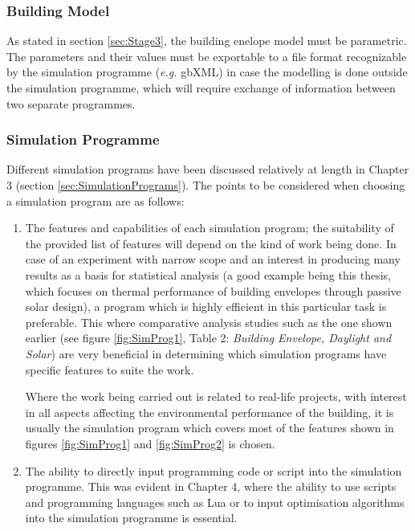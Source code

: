 \subsubsection{Building Model}

As stated in section \ref{sec:Stage3}, the building enelope model must be parametric. The parameters and their values must be exportable to a file format recognizable by the simulation programme (\emph{e.g.} gbXML) in case the modelling is done outside the simulation programme, which will require exchange of information between two separate programmes.

\subsubsection{Simulation Programme}
Different simulation programs have been discussed relatively at length in Chapter 3 (section \ref{sec:SimulationPrograms}). The points to be considered when choosing a simulation program are as follows:

\begin{enumerate}
	\item The features and capabilities of each simulation program; the suitability of the provided list of features will depend on the kind of work being done. In case of an experiment with narrow scope and an interest in producing many results as a basis for statistical analysis (a good example being this thesis, which focuses on thermal performance of building envelopes through passive solar design), a program which is highly efficient in this particular task is preferable. This where comparative analysis studies such as the one shown earlier (see figure \ref{fig:SimProg1}, Table 2: \emph{Building Envelope, Daylight and Solar}) are very beneficial in determining which simulation programs have specific features to suite the work.

		Where the work being carried out is related to real-life projects, with interest in all aspects affecting the environmental performance of the building, it is usually the simulation program which covers most of the features shown in figures \ref{fig:SimProg1} and \ref{fig:SimProg2} is chosen.
	
	\item The ability to directly input programming code or script into the simulation programme. This was evident in Chapter 4, where the ability to use scripts and programming languages such as Lua or to input optimisation algorithms into the simulation programme is essential.
\end{enumerate}

